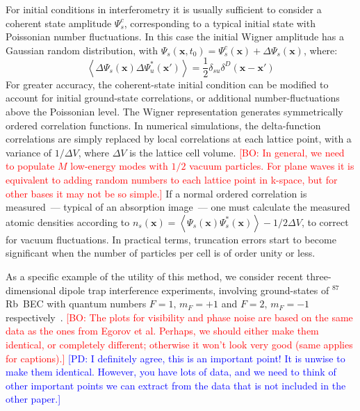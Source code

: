\documentclass[aps,prl,twocolumn,showpacs,amsmath,amssymb,superscriptaddress]{revtex4-1}
\newcommand{\bogdansremark}[1]{\textcolor{red}{{[}BO: #1{]}}}
\newcommand{\petersremark}[1]{\textcolor{blue}{{[}PD: #1{]}}}
\newcommand{\Rb}{$^{87}$Rb}
\begin{document}
For initial conditions in interferometry it is usually sufficient
to consider a coherent state amplitude $\Psi_{s}^{c}$,
corresponding to a typical initial state with Poissonian number fluctuations.
In this case the initial Wigner amplitude has a Gaussian random distribution,
with $\Psi_{s}(\mathbf{x},t_{0})=\Psi_{s}^{c}(\mathbf{x})+\Delta\Psi_{s}(\mathbf{x})$,
where:
\begin{equation}
	\left\langle
		\Delta\Psi_{s}(\mathbf{x}) \Delta\Psi_{u}^{*}(\mathbf{x}')
	\right\rangle =
	\frac{1}{2} \delta_{su} \delta^{D} \left( \mathbf{x} - \mathbf{x}'\right)
\end{equation}
For greater accuracy, the coherent-state initial condition
can be modified to account for initial ground-state correlations,
or additional number-fluctuations above the Poissonian level.
The Wigner representation generates symmetrically ordered correlation functions.
In numerical simulations, the delta-function correlations are simply replaced by
local correlations at each lattice point,
with a variance of $1/\Delta V$, where $\Delta V$ is the lattice cell volume.
	\bogdansremark{In general, we need to populate $M$ low-energy modes with $1/2$ vacuum particles.
	For plane waves it is equivalent to adding random numbers to each lattice point in k-space,
	but for other bases it may not be so simple.}
If a normal ordered correlation is measured~--- typical of an absorption image~---
one must calculate the measured atomic densities according to
$n_{s} \left( \mathbf{x} \right) = \left\langle
	\Psi_{s}(\mathbf{x}) \Psi_{s}^{*}(\mathbf{x})
\right\rangle -1/2\Delta V$,
to correct for vacuum fluctuations.
In practical terms, truncation errors start to become significant
when the number of particles per cell is of order unity or less.

As a specific example of the utility of this method,
we consider recent three-dimensional dipole trap interference experiments,
involving ground-states of \Rb~BEC with quantum numbers $F=1,\, m_{F}=+1$
and $F=2,\, m_{F}=-1$ respectively~\cite{Egorov2010}.
	\bogdansremark{The plots for visibility and phase noise are based on the same data
	as the ones from Egorov et al.
	Perhaps, we should either make them identical, or completely different;
	otherwise it won't look very good (same applies for captions).}
	\petersremark{I definitely agree, this is an important point!
	It is unwise to make them identical.
	However, you have lots of data, and we need to think of other important points
	we can extract from the data that is not included in the other paper.}
\end{document}
